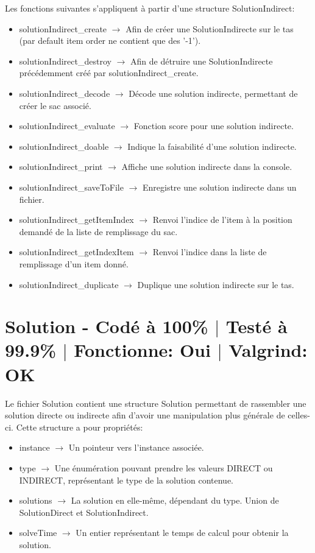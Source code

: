 \documentclass{EPUProjetPeiP}
\newcommand{\comp}[5]{
	\section[#1]{#1 {\small - Codé à #2\% $\vert$ Testé à #3\% $\vert$ Fonctionne: #4 $\vert$ Valgrind: #5}}
}
\begin{document}
Les fonctions suivantes s'appliquent à partir d'une structure SolutionIndirect:
\begin{itemize}
	\item solutionIndirect\_create $\longrightarrow$ Afin de créer une SolutionIndirecte sur le tas (par default item order ne contient que des '-1').
	\item solutionIndirect\_destroy $\longrightarrow$ Afin de détruire une SolutionIndirecte précédemment créé par solutionIndirect\_create.
	\item solutionIndirect\_decode $\longrightarrow$ Décode une solution indirecte, permettant de créer le sac associé.
	\item solutionIndirect\_evaluate $\longrightarrow$ Fonction score pour une solution indirecte.
	\item solutionIndirect\_doable $\longrightarrow$ Indique la faisabilité d'une solution indirecte.
	\item solutionIndirect\_print $\longrightarrow$ Affiche une solution indirecte dans la console.
	\item solutionIndirect\_saveToFile $\longrightarrow$ Enregistre une solution indirecte dans un fichier.
	\item solutionIndirect\_getItemIndex $\longrightarrow$ Renvoi l'indice de l'item à la position demandé de la liste de remplissage du sac.
	\item solutionIndirect\_getIndexItem $\longrightarrow$ Renvoi l'indice dans la liste de remplissage d'un item donné.
	\item solutionIndirect\_duplicate $\longrightarrow$ Duplique une solution indirecte sur le tas.
\end{itemize}

\comp{Solution}{100}{99.9}{Oui}{OK}
Le fichier Solution contient une structure Solution permettant de rassembler une solution directe ou indirecte afin d'avoir une manipulation plus générale de celles-ci. Cette structure a pour propriétés:
\begin{itemize}
	\item instance $\longrightarrow$ Un pointeur vers l'instance associée.
	\item type $\longrightarrow$ Une énumération pouvant prendre les valeurs DIRECT ou INDIRECT, représentant le type de la solution contenue.
	\item solutions $\longrightarrow$ La solution en elle-même, dépendant du type. Union de SolutionDirect et SolutionIndirect.
	\item solveTime $\longrightarrow$ Un entier représentant le temps de calcul pour obtenir la solution.\\
\end{itemize}
\end{document}
